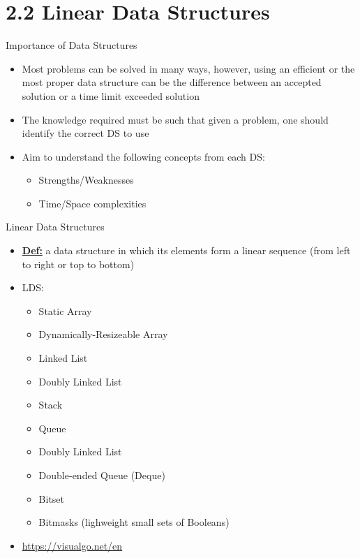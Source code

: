\documentclass{beamer}
\begin{document}
\section{2.2 Linear Data Structures}

\begin{frame}{Importance of Data Structures}
    \begin{itemize}
        \item Most problems can be solved in many ways, however, using an efficient or the most proper data structure can be the difference between an accepted solution or a time limit exceeded solution
        \item The knowledge required must be such that given a problem, one should identify the correct DS to use
        \item Aim to understand the following concepts from each DS:
            \begin{itemize}
                \item Strengths/Weaknesses
                \item Time/Space complexities
            \end{itemize}
    \end{itemize}
\end{frame}

\begin{frame}{Linear Data Structures}
    \begin{itemize}
        \item \underline{\textbf{Def:}} a data structure in which its elements form a linear sequence (from left to right or top to bottom)
        
        \item LDS: 
        \begin{itemize}
            \item \color{blue} Static Array \color{black}
            \item \color{blue} Dynamically-Resizeable Array \color{black}
            \item \color{blue} Linked List \color{black}
			\item \color{blue} Doubly Linked List \color{black}
            \item \color{blue} Stack \color{black}
            \item \color{blue} Queue \color{black}
            \item \color{blue} Doubly Linked List \color{black}
            \item Double-ended Queue (Deque)
            \item Bitset
            \item Bitmasks (lighweight small sets of Booleans)
        \end{itemize}
        \item \url{https://visualgo.net/en}
    \end{itemize}
\end{frame}
\end{document}

